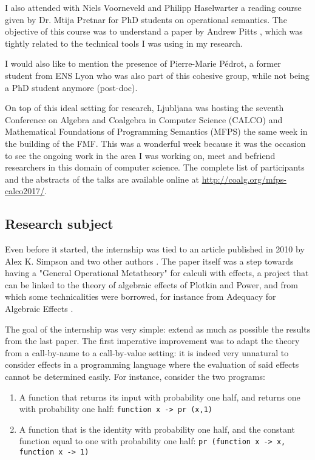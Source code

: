 I also attended with Niels Voorneveld and Philipp Haselwarter 
a reading course given by Dr. Mtija Pretnar for PhD students on operational semantics. The 
objective of this course was to understand a paper by Andrew Pitts 
\cite{Pitts2000}, which was tightly related to the technical tools I was 
using in my research. 

I would also like to mention the presence of 
Pierre-Marie Pédrot, a former student from ENS Lyon 
who was also part of this cohesive group, while 
not being a PhD student anymore (post-doc).

On top of this ideal setting for research, 
Ljubljana was hosting the seventh Conference on Algebra and
Coalgebra in Computer Science (CALCO) and 
Mathematical Foundations of Programming Semantics (MFPS)
the same week in the building of the FMF. This was
a wonderful week because it was the occasion 
to see the ongoing work in the area I was working on,
meet and befriend researchers in this domain 
of computer science. The complete list of participants 
and the abstracts of the talks are
available online at \url{http://coalg.org/mfps-calco2017/}.

\subsection{Research subject}

Even before it started, the internship 
was tied to an article published in 2010 
by Alex K. Simpson and two other authors \cite{gom}.
The paper itself was a step towards having a 
"General Operational Metatheory" for calculi 
with effects, a project that can be linked 
to the theory of algebraic effects of Plotkin 
and Power, and from which some technicalities 
were borrowed, for instance from 
Adequacy for Algebraic Effects \cite{plotkin2001adequacy}.

The goal of the internship was very simple: extend 
as much as possible the results from the last paper. 
The first imperative improvement was to adapt the theory 
from a call-by-name to a call-by-value setting:
it is indeed very unnatural to consider effects in 
a programming language where the evaluation of said 
effects cannot be determined easily. For instance, consider 
the two programs:

\begin{enumerate}
    \item A function that returns its input with probability 
        one half, and returns one with probability one half: 
        \texttt{function x -> pr (x,1)}
    \item A function that is the identity with probability 
        one half, and the constant function equal to one 
        with probability one half: 
        \texttt{pr (function x -> x, function x -> 1)}
\end{enumerate}

